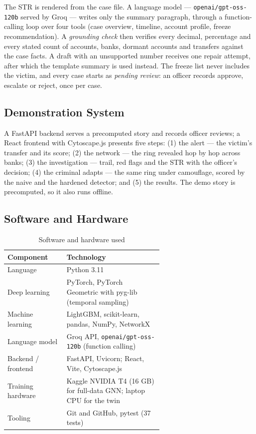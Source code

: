 The STR is rendered from the case file. A language model --- \texttt{openai/gpt-oss-120b} \cite{openai2025gptoss} served by Groq --- writes only the summary paragraph, through a function-calling loop over four tools (case overview, timeline, account profile, freeze recommendation). A \emph{grounding check} then verifies every decimal, percentage and every stated count of accounts, banks, dormant accounts and transfers against the case facts. A draft with an unsupported number receives one repair attempt, after which the template summary is used instead. The freeze list never includes the victim, and every case starts as \emph{pending review}: an officer records approve, escalate or reject, once per case.

\subsection{Demonstration System}
A FastAPI backend serves a precomputed story and records officer reviews; a React frontend with Cytoscape.js \cite{franz2016cytoscape} presents five steps: (1) the alert --- the victim's transfer and its score; (2) the network --- the ring revealed hop by hop across banks; (3) the investigation --- trail, red flags and the STR with the officer's decision; (4) the criminal adapts --- the same ring under camouflage, scored by the naive and the hardened detector; and (5) the results. The demo story is precomputed, so it also runs offline.

\subsection{Software and Hardware}
\begin{table}[H]
\centering
\renewcommand{\arraystretch}{1.2}
\begin{tabular}{|l|>{\raggedright\arraybackslash}p{0.62\linewidth}|} \hline
\textbf{Component} & \textbf{Technology} \\ \hline
Language & Python 3.11 \\ \hline
Deep learning & PyTorch, PyTorch Geometric with pyg-lib (temporal sampling) \\ \hline
Machine learning & LightGBM, scikit-learn, pandas, NumPy, NetworkX \\ \hline
Language model & Groq API, \texttt{openai/gpt-oss-120b} (function calling) \\ \hline
Backend / frontend & FastAPI, Uvicorn; React, Vite, Cytoscape.js \\ \hline
Training hardware & Kaggle NVIDIA T4 (16 GB) for full-data GNN; laptop CPU for the twin \\ \hline
Tooling & Git and GitHub, pytest (37 tests) \\ \hline
\end{tabular}
\caption{Software and hardware used}
\label{tab:software}
\end{table}

